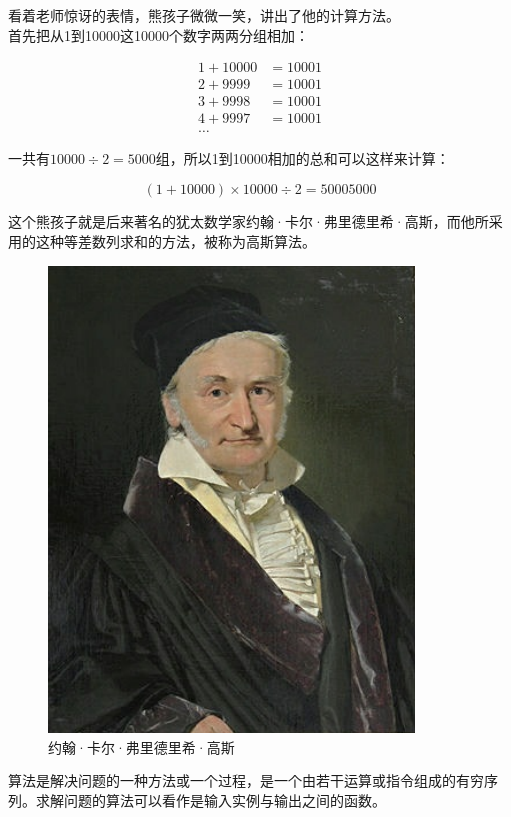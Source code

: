 看着老师惊讶的表情，熊孩子微微一笑，讲出了他的计算方法。 \\

首先把从1到10000这10000个数字两两分组相加：

\vspace{-1cm}

\begin{align*}
	1 + 10000 & = 10001 \\
	2 + 9999  & = 10001 \\
	3 + 9998  & = 10001 \\
	4 + 9997  & = 10001 \\
	\dots
\end{align*}

一共有$ 10000 \div 2 = 5000 $组，所以1到10000相加的总和可以这样来计算：

$$
	(1 + 10000) \times 10000 \div 2 = 50005000
$$

这个熊孩子就是后来著名的犹太数学家约翰·卡尔·弗里德里希·高斯，而他所采用的这种等差数列求和的方法，被称为高斯算法。

\begin{figure}[H]
	\centering
	\includegraphics[scale=0.6]{img/C1/1-1/3.png}
	\caption{约翰·卡尔·弗里德里希·高斯}
\end{figure}

算法是解决问题的一种方法或一个过程，是一个由若干运算或指令组成的有穷序列。求解问题的算法可以看作是输入实例与输出之间的函数。 \\

